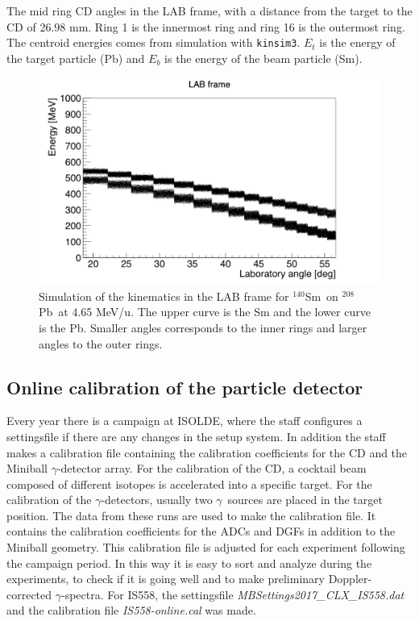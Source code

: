 \documentclass[twoside,english]{uiofysmaster/uiofysmaster}
\newcommand{\Sm}{$^{140}$Sm} %
\newcommand{\Pb}{$^{208}$Pb}
\newcommand{\ga}{$\gamma$}
\begin{document}
\begin{table}[ht] 
    \centering 
    \caption{The mid ring CD angles in the LAB frame, with a distance from the target to the CD of 26.98 mm. Ring 1 is the innermost ring and ring 16 is the outermost ring. The centroid energies comes from simulation with \texttt{kinsim3}. $E_t$ is the energy of the target particle (Pb) and $E_b$ is the energy of the beam particle (Sm).}
	
	\label{tab:CD_angles}
\end{table}


\begin{figure}[ht]
	\centering
    \includegraphics[width=\linewidth]{../Plots/simulation/kin_140Sm_208Pb.png}
	\caption{Simulation of the kinematics in the LAB frame for \Sm\ on \Pb\ at 4.65 MeV/u. The upper curve is the Sm and the lower curve is the Pb. Smaller angles corresponds to the inner rings and larger angles to the outer rings.}
	\label{fig:kinsim}
\end{figure}



\subsection{Online calibration of the particle detector}
Every year there is a campaign at ISOLDE, where the staff configures a settingsfile if there are any changes in the setup system. 
In addition the staff makes a calibration file containing the calibration coefficients for the CD and the Miniball \ga-detector array. 
For the calibration of the CD, a cocktail beam composed of different isotopes is accelerated into a specific target. 
For the calibration of the \ga-detectors, usually two \ga\ sources are placed in the target position.
The data from these runs are used to make the calibration file. 
It contains the calibration coefficients for the ADCs and DGFs in addition to the Miniball geometry.
This calibration file is adjusted for each experiment following the campaign period.
In this way it is easy to sort and analyze during the experiments, to check if it is going well and to make preliminary Doppler-corrected \ga-spectra.
For IS558, the settingsfile \textit{MBSettings2017\_CLX\_IS558.dat} and the calibration file \textit{IS558-online.cal} was made.
\end{document}
